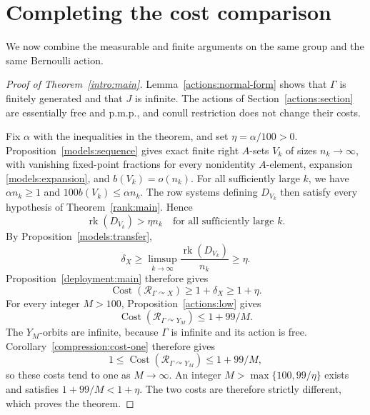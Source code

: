 \section{Completing the cost comparison}
\label{conclusion:section}

We now combine the measurable and finite arguments on the same group
and the same Bernoulli action.

\begin{proof}[Proof of Theorem~\ref{intro:main}]
Lemma~\ref{actions:normal-form} shows that $\Gamma$ is finitely
generated and that $J$ is infinite. The actions of
Section~\ref{actions:section} are essentially free and p.m.p., and
conull restriction does not change their costs.

Fix $\alpha$ with the inequalities in the theorem, and set
$\eta=\alpha/100>0$. Proposition~\ref{models:sequence} gives exact
finite right $A$-sets $V_k$ of sizes $n_k\to\infty$, with vanishing
fixed-point fractions for every nonidentity $A$-element, expansion
\eqref{models:expansion}, and $b(V_k)=o(n_k)$. For all sufficiently
large $k$, we have $\alpha n_k\ge1$ and
$100b(V_k)\le\alpha n_k$. The row systems defining $D_{V_k}$ then
satisfy every hypothesis of Theorem~\ref{rank:main}. Hence
\[
 \operatorname{rk}(D_{V_k})>\eta n_k
 \quad\text{for all sufficiently large }k.
\]
By Proposition~\ref{models:transfer},
\[
 \delta_X\ge\limsup_{k\to\infty}
       \frac{\operatorname{rk}(D_{V_k})}{n_k}\ge\eta.
\]
Proposition~\ref{deployment:main} therefore gives
\[
 \operatorname{Cost}(\mathcal R_{\Gamma\curvearrowright X})
 \ge1+\delta_X\ge1+\eta.
\]
For every integer $M>100$, Proposition~\ref{actions:low} gives
\[
 \operatorname{Cost}(\mathcal R_{\Gamma\curvearrowright Y_M})
 \le1+99/M.
\]
The $Y_M$-orbits are infinite, because $\Gamma$ is infinite and its
action is free. Corollary~\ref{compression:cost-one} therefore gives
\[
 1\le\operatorname{Cost}(\mathcal R_{\Gamma\curvearrowright Y_M})
       \le1+99/M,
\]
so these costs tend to one as $M\to\infty$.
An integer $M>\max\{100,99/\eta\}$ exists and satisfies
$1+99/M<1+\eta$. The two costs are therefore strictly different,
which proves the theorem.
\end{proof}
